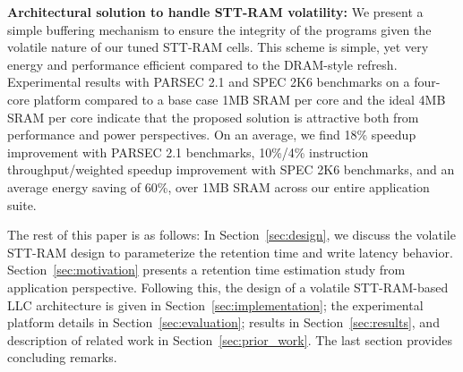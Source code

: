 \noindent\textbf{Architectural solution to handle STT-RAM volatility:} We present a simple buffering
mechanism to ensure the integrity of the programs given the volatile nature of our tuned STT-RAM cells.
This scheme is simple, yet very energy and performance efficient compared to the DRAM-style refresh.
Experimental results with PARSEC 2.1 and SPEC 2K6 benchmarks on a four-core platform
compared to a base case 1MB SRAM per core and the ideal 4MB SRAM per core indicate that the proposed
solution is attractive both from performance and power perspectives. On an average, we find 18\% speedup
improvement with PARSEC 2.1 benchmarks, 10\%/4\% instruction throughput/weighted speedup improvement
with SPEC 2K6 benchmarks, and an average energy saving of 60\%, over 1MB SRAM across our entire application suite.




The rest of this paper is as follows: In Section~\ref{sec:design}, we discuss the volatile STT-RAM design to
parameterize the retention time and write latency behavior. Section~\ref{sec:motivation} presents a retention time
estimation study from application perspective. Following this, the design of a volatile STT-RAM-based LLC architecture is given in Section~\ref{sec:implementation}; the experimental platform details in Section~\ref{sec:evaluation};
results in Section~\ref{sec:results}, and description of related work in Section~\ref{sec:prior_work}.
The last section provides concluding remarks.



